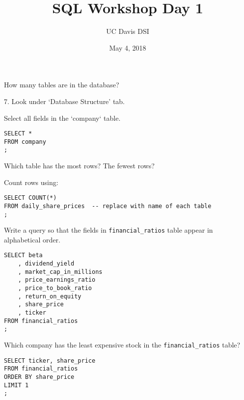 \documentclass[10pt]{exam}
\begin{document}
 
\title{SQL Workshop Day 1}
\author{UC Davis DSI}
\date{May 4, 2018}

\maketitle

\begin{questions}

\question How many tables are in the database?

\begin{solution}
    7. Look under `Database Structure' tab.
\end{solution}


\question Select all fields in the `company` table.

\begin{solution}
\begin{lstlisting}
SELECT *
FROM company
;
\end{lstlisting}
\end{solution}


\question Which table has the most rows? The fewest rows?

\begin{solution}

    Count rows using:

\begin{lstlisting}
SELECT COUNT(*)
FROM daily_share_prices  -- replace with name of each table
;
\end{lstlisting}
\end{solution}


\question Write a query so that the fields in \texttt{financial\_ratios} table
appear in alphabetical order.

\begin{solution}
\begin{lstlisting}
SELECT beta
    , dividend_yield
    , market_cap_in_millions
    , price_earnings_ratio
    , price_to_book_ratio
    , return_on_equity
    , share_price
    , ticker
FROM financial_ratios
;
\end{lstlisting}
\end{solution}


    \question Which company has the least expensive stock in the
    \texttt{financial\_ratios} table?

\begin{solution}
\begin{lstlisting}
SELECT ticker, share_price
FROM financial_ratios
ORDER BY share_price
LIMIT 1
;
\end{lstlisting}
\end{solution}


\end{questions}
\end{document}
